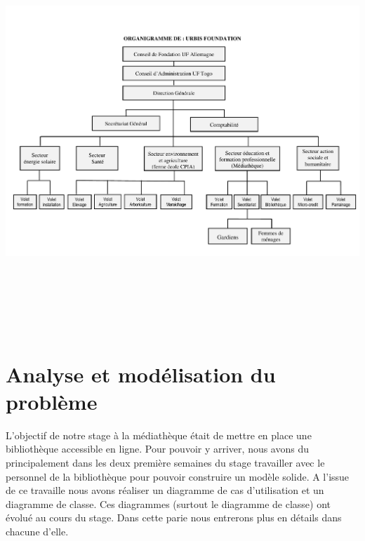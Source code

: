 \documentclass[12pt,a4paper]{article}
\begin{document}
\includegraphics[width=16cm,height=15cm]{./images/ORGANIGRAMME.pdf} 
\newpage
\section{Analyse et modélisation du problème}
L'objectif de notre stage à la médiathèque était de mettre en place une bibliothèque accessible en ligne. Pour pouvoir y arriver, nous avons du principalement dans les deux première semaines du stage travailler avec le personnel de la bibliothèque pour pouvoir construire un modèle solide. A l'issue 
de ce travaille nous avons réaliser un diagramme de cas d'utilisation et un 
diagramme de classe. Ces diagrammes (surtout le diagramme de classe) ont évolué
au cours du stage. Dans cette parie nous entrerons plus en détails dans chacune 
d'elle.
\end{document}
